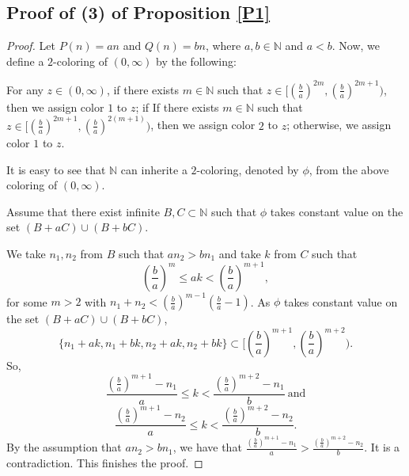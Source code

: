 \documentclass[reqno,12pt]{amsart}
\def \N {\mathbb N}
\numberwithin{equation}{section}
\begin{document}
\subsection{Proof of (3) of Proposition \ref{P1}}
\begin{proof}
	Let $P(n)=an$ and $Q(n)=bn$, where $a,b\in \N$ and $a<b$. Now, we define a $2$-coloring of $(0,\infty)$ by the following:
	
	For any $z\in (0,\infty)$, if there exists $m\in \N$ such that $z\in [(\frac{b}{a})^{2m},(\frac{b}{a})^{2m+1})$, then we assign color $1$ to $z$; if If there exists $m\in \N$ such that $z\in [(\frac{b}{a})^{2m+1},(\frac{b}{a})^{2(m+1)})$, then we assign color $2$ to $z$; otherwise, we assign color $1$ to $z$.
	
	It is easy to see that $\N$ can inherite a $2$-coloring, denoted by $\phi$, from the above coloring of $(0,\infty)$.
	
	Assume that there exist infinite $B,C\subset \N$ such that $\phi$ takes constant value on the set $(B+aC)\cup (B+bC)$.
	
	We take $n_1,n_2$ from $B$ such that $an_2>bn_1$ and take $k$ from $C$ such that $$(\frac{b}{a})^{m}\le ak<(\frac{b}{a})^{m+1},$$ for some $m>2$ with $n_1+n_2<(\frac{b}{a})^{m-1}(\frac{b}{a}-1)$. As $\phi$ takes constant value on the set $(B+aC)\cup (B+bC)$, $$\{n_1+ak,n_1+bk,n_2+ak,n_2+bk\}\subset [(\frac{b}{a})^{m+1},(\frac{b}{a})^{m+2}).$$
	So, $$\frac{(\frac{b}{a})^{m+1}-n_1}{a}\le k<\frac{(\frac{b}{a})^{m+2}-n_1}{b}\ \text{and}$$ $$\frac{(\frac{b}{a})^{m+1}-n_2}{a}\le k<\frac{(\frac{b}{a})^{m+2}-n_2}{b}.$$ By the assumption that $an_2>bn_1$, we have that $\frac{(\frac{b}{a})^{m+1}-n_1}{a}>\frac{(\frac{b}{a})^{m+2}-n_2}{b}$. It is a contradiction. This finishes the proof.
\end{proof}
\end{document}
